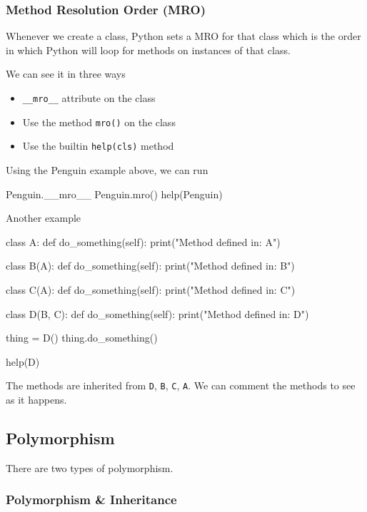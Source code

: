 \subsubsection{Method Resolution Order (MRO)}

Whenever we create a class, Python sets a MRO for that class which is the order in which Python will loop for methods on instances of that class.

We can see it in three ways
\begin{itemize}
    \item \verb|__mro__| attribute on the class 
    \item Use the method \verb|mro()| on the class 
    \item Use the builtin \verb|help(cls)| method
\end{itemize}

Using the Penguin example above, we can run
\begin{listing}{1}
Penguin.__mro__    
Penguin.mro()
help(Penguin)
\end{listing}

Another example
\begin{shaded}
\begin{listing}{1}
class A:
    def do_something(self):
        print("Method defined in: A")    

class B(A):
    def do_something(self):
        print("Method defined in: B")        

class C(A):
    def do_something(self):
        print("Method defined in: C")

class D(B, C):
    def do_something(self):
        print("Method defined in: D")        

thing = D()        
thing.do_something()

help(D)
\end{listing}    
The methods are inherited from \verb|D|, \verb|B|, \verb|C|, \verb|A|. We can comment the methods to see as it happens.
\end{shaded}


\subsection{Polymorphism}

There are two types of polymorphism.

\subsubsection{Polymorphism \& Inheritance}


